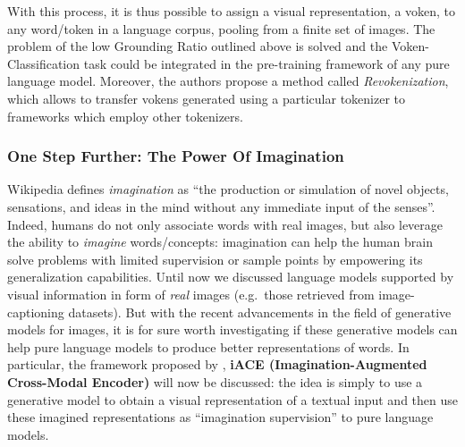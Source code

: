 \documentclass[
]{krantz}
\begin{document}
With this process, it is thus possible to assign a visual representation, a voken, to any word/token in a language corpus, pooling from a finite set of images. The problem of the low Grounding Ratio outlined above is solved and the Voken-Classification task could be integrated in the pre-training framework of any pure language model. Moreover, the authors propose a method called \emph{Revokenization}, which allows to transfer vokens generated using a particular tokenizer to frameworks which employ other tokenizers.

\hypertarget{one-step-further-the-power-of-imagination}{%
\subsubsection{One Step Further: The Power Of Imagination}\label{one-step-further-the-power-of-imagination}}

Wikipedia defines \emph{imagination} as ``the production or simulation of novel objects, sensations, and ideas in the mind without any immediate input of the senses''. Indeed, humans do not only associate words with real images, but also leverage the ability to \emph{imagine} words/concepts: imagination can help the human brain solve problems with limited supervision or sample points by empowering its generalization capabilities. Until now we discussed language models supported by visual information in form of \emph{real} images (e.g.~those retrieved from image-captioning datasets). But with the recent advancements in the field of generative models for images, it is for sure worth investigating if these generative models can help pure language models to produce better representations of words. In particular, the framework proposed by \citet{lu2022imagination}, \textbf{iACE (Imagination-Augmented Cross-Modal Encoder)} will now be discussed: the idea is simply to use a generative model to obtain a visual representation of a textual input and then use these imagined representations as ``imagination supervision'' to pure language models.
\end{document}
